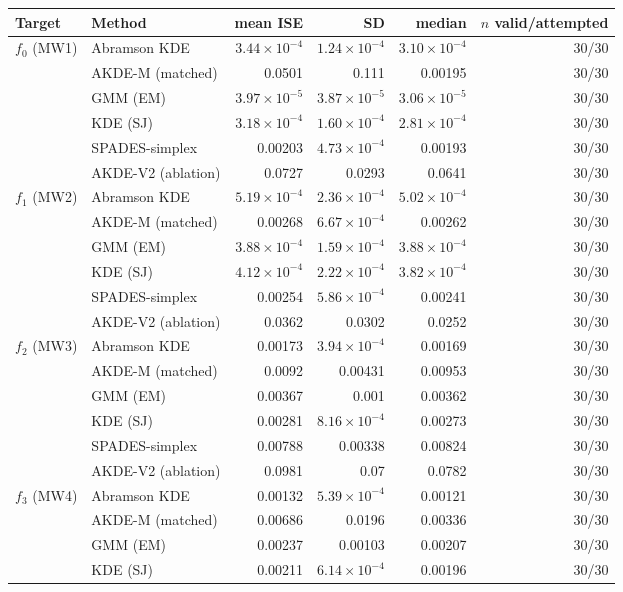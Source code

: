\begin{tabular}{llrrrr}
\toprule
Target & Method & mean ISE & SD & median & $n$ valid/attempted \\
\midrule
$f_{0}$ (MW1) & Abramson KDE & $3.44\times10^{-4}$ & $1.24\times10^{-4}$ & $3.10\times10^{-4}$ & 30/30 \\
 & AKDE-M (matched) & 0.0501 & 0.111 & 0.00195 & 30/30 \\
 & GMM (EM) & $3.97\times10^{-5}$ & $3.87\times10^{-5}$ & $3.06\times10^{-5}$ & 30/30 \\
 & KDE (SJ) & $3.18\times10^{-4}$ & $1.60\times10^{-4}$ & $2.81\times10^{-4}$ & 30/30 \\
 & SPADES-simplex & 0.00203 & $4.73\times10^{-4}$ & 0.00193 & 30/30 \\
 & AKDE-V2 (ablation) & 0.0727 & 0.0293 & 0.0641 & 30/30 \\
$f_{1}$ (MW2) & Abramson KDE & $5.19\times10^{-4}$ & $2.36\times10^{-4}$ & $5.02\times10^{-4}$ & 30/30 \\
 & AKDE-M (matched) & 0.00268 & $6.67\times10^{-4}$ & 0.00262 & 30/30 \\
 & GMM (EM) & $3.88\times10^{-4}$ & $1.59\times10^{-4}$ & $3.88\times10^{-4}$ & 30/30 \\
 & KDE (SJ) & $4.12\times10^{-4}$ & $2.22\times10^{-4}$ & $3.82\times10^{-4}$ & 30/30 \\
 & SPADES-simplex & 0.00254 & $5.86\times10^{-4}$ & 0.00241 & 30/30 \\
 & AKDE-V2 (ablation) & 0.0362 & 0.0302 & 0.0252 & 30/30 \\
$f_{2}$ (MW3) & Abramson KDE & 0.00173 & $3.94\times10^{-4}$ & 0.00169 & 30/30 \\
 & AKDE-M (matched) & 0.0092 & 0.00431 & 0.00953 & 30/30 \\
 & GMM (EM) & 0.00367 & 0.001 & 0.00362 & 30/30 \\
 & KDE (SJ) & 0.00281 & $8.16\times10^{-4}$ & 0.00273 & 30/30 \\
 & SPADES-simplex & 0.00788 & 0.00338 & 0.00824 & 30/30 \\
 & AKDE-V2 (ablation) & 0.0981 & 0.07 & 0.0782 & 30/30 \\
$f_{3}$ (MW4) & Abramson KDE & 0.00132 & $5.39\times10^{-4}$ & 0.00121 & 30/30 \\
 & AKDE-M (matched) & 0.00686 & 0.0196 & 0.00336 & 30/30 \\
 & GMM (EM) & 0.00237 & 0.00103 & 0.00207 & 30/30 \\
 & KDE (SJ) & 0.00211 & $6.14\times10^{-4}$ & 0.00196 & 30/30 \\

\end{tabular}
